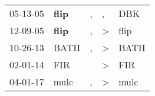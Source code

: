 \begin{supertabular}{p{0.07\textwidth}p{0.06\textwidth}p{0.02\textwidth}p{0.02\textwidth}p{0.06\textwidth}}
 05-13-05\textsuperscript{} &  \textbf{flip\textsuperscript{}} &  , &             , &   DBK\textsuperscript{} \\
 12-09-05\textsuperscript{} &  \textbf{flip\textsuperscript{}} &  , &  \textgreater &  flip\textsuperscript{} \\
 10-26-13\textsuperscript{} &           BATH\textsuperscript{} &  , &  \textgreater &  BATH\textsuperscript{} \\
 02-01-14\textsuperscript{} &            FIR\textsuperscript{} &    &  \textgreater &   FIR\textsuperscript{} \\
 04-01-17\textsuperscript{} &           mulc\textsuperscript{} &  , &  \textgreater &  mulc\textsuperscript{} \\
\end{supertabular}
